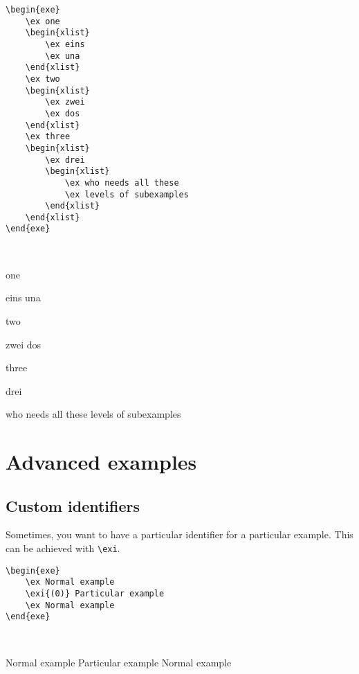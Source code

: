 \documentclass[output=paper]{langscibook}
\newcommand{\cmd}[1]{\texttt{\textbackslash#1}}
\begin{document}
\begin{minipage}[t]{.5\textwidth}
\begin{lstlisting}
\begin{exe}
    \ex one
    \begin{xlist}
        \ex eins
        \ex una
    \end{xlist}
    \ex two
    \begin{xlist}
        \ex zwei
        \ex dos
    \end{xlist}
    \ex three
    \begin{xlist}
        \ex drei
        \begin{xlist}
            \ex who needs all these
            \ex levels of subexamples
        \end{xlist}
    \end{xlist}
\end{exe}
 \end{lstlisting}
\end{minipage}~
\parbox[t]{.45\textwidth}{
\begin{exe}
    \ex one
    \begin{xlist}
        \ex eins
        \ex una
    \end{xlist}
    \ex two
    \begin{xlist}
        \ex zwei
        \ex dos
    \end{xlist}
    \ex three
    \begin{xlist}
        \ex drei
        \begin{xlist}
            \ex who needs all these
            \ex levels of subexamples
        \end{xlist}
    \end{xlist}
\end{exe}
}




\section{Advanced examples}
\subsection{Custom identifiers}
Sometimes, you want to have a particular identifier for a particular example. This can be achieved with \cmd{exi}.\medskip

\begin{minipage}[t]{.55\textwidth}
\begin{lstlisting}
\begin{exe}
    \ex Normal example
    \exi{(0)} Particular example
    \ex Normal example
\end{exe}
 \end{lstlisting}
\end{minipage}~
\parbox[t]{.45\textwidth}{
\begin{exe}
    \ex Normal example
     Particular example
    \ex Normal example
\end{exe}
}
\end{document}
